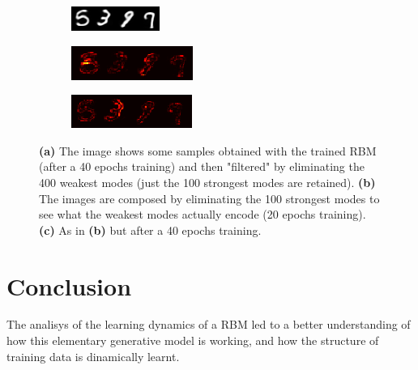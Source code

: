 \documentclass[notitlepage]{revtex4-1}
\begin{document}
\begin{figure}
  \begin{subfigure}{\linewidth}
  	\centering
    \includegraphics[width=.4\linewidth]{complete40ep.png}
    \caption{}
  \end{subfigure}\par
  \begin{subfigure}{\linewidth}
  	\centering
    \includegraphics[width=.4\linewidth]{difference20ep.png}
    \caption{}  
  \end{subfigure}\par
  \begin{subfigure}{\linewidth}
  	\centering
    \includegraphics[width=.4\linewidth]{difference40ep.png}
    \caption{}
  \end{subfigure}
  \caption{\textbf{(a)} The image shows some samples obtained with the trained RBM (after a 40 epochs training) and then "filtered" by eliminating the 400 weakest modes (just the 100 strongest modes are retained). \textbf{(b)} The images are composed by eliminating the 100 strongest modes to see what the weakest modes actually encode (20 epochs training). \textbf{(c)} As in \textbf{(b)} but after a 40 epochs training.}
  \label{fig:hf_modes}
\end{figure}

\section{Conclusion}

The analisys of the learning dynamics of a RBM led to a better understanding of how this elementary generative model is working, and how the structure of training data is dinamically learnt. 
\end{document}

